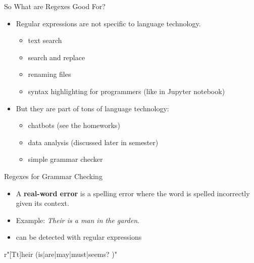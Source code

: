 \documentclass[professionalfonts, xcolor={usenames,svgnames,x11names,table}]{beamer}
\begin{document}
\begin{frame}{So What are Regexes Good For?}
    \begin{itemize}
        \item Regular expressions are not specific to language technology.
            \begin{itemize}
                \item text search
                \item search and replace
                \item renaming files
                \item syntax highlighting for programmers (like in Jupyter notebook)
            \end{itemize}
        \item But they are part of tons of language technology:
        \begin{itemize}
            \item chatbots (see the homeworks)
            \item data analysis (discussed later in semester)
            \item simple grammar checker
        \end{itemize}
    \end{itemize}
\end{frame}

\begin{frame}[fragile]{Regexes for Grammar Checking}
    \begin{itemize}
        \item A \textbf{real-word error} is a spelling error where the word is spelled incorrectly given its context.
        \item Example: \emph{Their is a man in the garden}.
        \item can be detected with regular expressions
    \end{itemize}
\begin{pythoncode}
    r"[Tt]heir (is|are|may|must|seems? )"
\end{pythoncode}
\end{frame}
\end{document}
